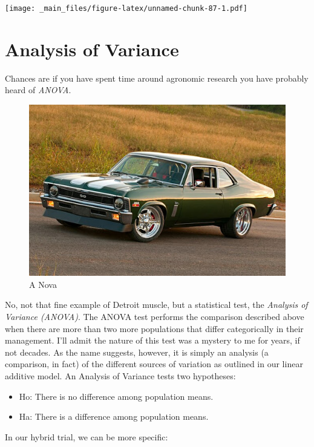 \documentclass[
]{book}
\providecommand{\tightlist}{%
  \setlength{\itemsep}{0pt}\setlength{\parskip}{0pt}}
\begin{document}
\texttt{[image: \_main\_files/figure-latex/unnamed-chunk-87-1.pdf]}

\hypertarget{analysis-of-variance}{%
\section{Analysis of Variance}\label{analysis-of-variance}}

Chances are if you have spent time around agronomic research you have probably heard of \emph{ANOVA}.

\begin{figure}
\centering
\includegraphics{data-unit-6/nova.jpg}
\caption{A Nova}
\end{figure}

No, not that fine example of Detroit muscle, but a statistical test, the \emph{Analysis of Variance (ANOVA)}. The ANOVA test performs the comparison described above when there are more than two more populations that differ categorically in their management. I'll admit the nature of this test was a mystery to me for years, if not decades. As the name suggests, however, it is simply an analysis (a comparison, in fact) of the different sources of variation as outlined in our linear additive model. An Analysis of Variance tests two hypotheses:

\begin{itemize}
\tightlist
\item
  Ho: There is no difference among population means.
\item
  Ha: There is a difference among population means.
\end{itemize}

In our hybrid trial, we can be more specific:
\end{document}
